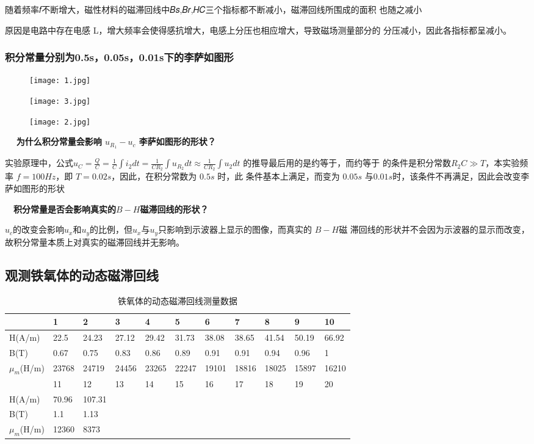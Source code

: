 \documentclass[12pt,a4paper]{article}
\begin{document}
随着频率𝑓不断增大，磁性材料的磁滞回线中𝐵𝑠,𝐵𝑟,𝐻𝐶三个指标都不断减小，磁滞回线所围成的面积
也随之减小\par
原因是电路中存在电感 L，增大频率会使得感抗增大，电感上分压也相应增大，导致磁场测量部分的
分压减小，因此各指标都呈减小。

\subsubsection{积分常量分别为0.5s，0.05s，0.01s下的李萨如图形}
\begin{figure}[H]
    \centering
    \texttt{[image: 1.jpg]}
\end{figure}
\begin{figure}[H]
    \centering
    \texttt{[image: 3.jpg]}
\end{figure}
\begin{figure}[H]
    \centering
    \texttt{[image: 2.jpg]}
\end{figure}

$\quad$ \textbf{为什么积分常量会影响 $u_{R_1}-u_c$ 李萨如图形的形状？}\par
实验原理中，公式${u_C} = \frac{Q}{C} = \frac{1}{C}\int {{i_2}dt}  = \frac{1}{{C{R_2}}}\int {{u_{{R_2}}}dt}  \approx \frac{1}{{C{R_2}}}\int {{u_2}dt}$
的推导最后用的是约等于，而约等于
的条件是积分常数$R_2 C \gg T$，本实验频率 $f=100Hz$，即 $T=0.02s$，因此，在积分常数为 $0.5s$ 时，此
条件基本上满足，而变为 $0.05s$ 与$ 0.01s $时，该条件不再满足，因此会改变李萨如图形的形状

$\quad$\textbf{积分常量是否会影响真实的$ B − H $磁滞回线的形状？}\par
$u_c$的改变会影响$u_x$和$u_y$的比例，但$u_x$与$u_y$只影响到示波器上显示的图像，而真实的 $B − H $磁
滞回线的形状并不会因为示波器的显示而改变，故积分常量本质上对真实的磁滞回线并无影响。
\subsection{观测铁氧体的动态磁滞回线}
\begin{table}[H]
    \centering
    \caption{铁氧体的动态磁滞回线测量数据}
    \begin{tabular}{|l|l|l|l|l|l|l|l|l|l|l|}
    \hline
        ~ & 1 & 2 & 3 & 4 & 5 & 6 & 7 & 8 & 9 & 10\\ \hline
        H(A/m) & 22.5  & 24.23  & 27.12  & 29.42  & 31.73  & 38.08 & 38.65  & 41.54  & 50.19  & 66.92  \\ \hline
        B(T) & 0.67  & 0.75& 0.83  & 0.86  & 0.89  & 0.91  & 0.91  & 0.94  & 0.96  & 1  \\ \hline
        $\mu_m$(H/m) & 23768  & 24719  & 24456  & 23265  & 22247  & 19101  & 18816  & 18025  & 15897  & 16210  \\ \hline
       ~&11&12&13&14&15&16&17&18&19&20\\\hline
       H(A/m)&70.96&107.31&&&&&&&& \\\hline
       B(T)&1.1&1.13&&&&&&&&\\\hline
       $\mu_m$(H/m)&12360&8373&&&&&&&&\\\hline
    \end{tabular}
\end{table}
\end{document}
